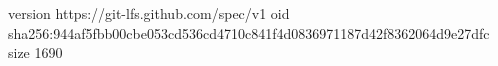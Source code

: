 version https://git-lfs.github.com/spec/v1
oid sha256:944af5fbb00cbe053cd536cd4710c841f4d0836971187d42f8362064d9e27dfc
size 1690

